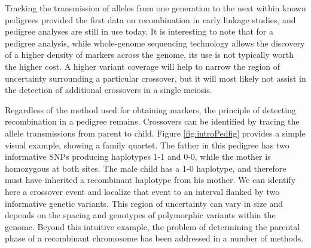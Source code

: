 Tracking the transmission of alleles from one generation to the next within known pedigrees provided the first data on recombination in early linkage studies, and pedigree analyses are still in use today.
It is interesting to note that for a pedigree analysis, 
while whole-genome sequencing technology allows the discovery of a higher density of markers across the genome, its use is not typically worth the higher cost.
A higher variant coverage will help to narrow the region of uncertainty surrounding a particular crossover, but it will most likely not assist in the detection of additional crossovers in a single meiosis.

Regardless of the method used for obtaining markers, the principle of detecting recombination in a pedigree remains.
Crossovers can be identified by tracing the allele transmissions from parent to child.
Figure \ref{fig:introPedfig} provides a simple visual example, showing a family quartet.
The father in this pedigree has two informative SNPs producing haplotypes 1-1 and 0-0, while the mother is homozygous at both sites.
The male child has a 1-0 haplotype, and therefore must have inherited a recombinant haplotype from his mother.
We can identify here a crossover event and localize that event to an interval flanked by two informative genetic variants.
This region of uncertainty can vary in size and depends on the spacing and genotypes of polymorphic variants within the genome.
Beyond this intuitive example, the problem of determining the parental phase of a recombinant chromosome has been addressed in a number of methods.
%
